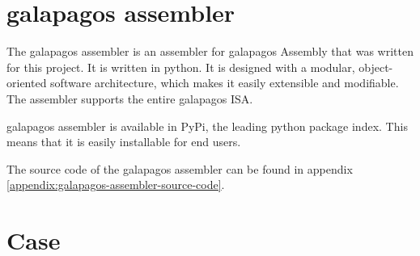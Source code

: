 \section{\Gls{galapagos assembler}}

The \Gls{galapagos assembler} is an assembler for \Gls{galapagos} Assembly that was written for this project.
It is written in python. 
It is designed with a modular, object-oriented software architecture, which makes it easily extensible and modifiable.
The assembler supports the entire \Gls{galapagos} ISA.


\Gls{galapagos assembler} is available in PyPi, the leading python package index.
This means that it is easily installable for end users.

The source code of the \Gls{galapagos assembler} can be found in appendix \vref{appendix:galapagos-assembler-source-code}.

\section{Case}

